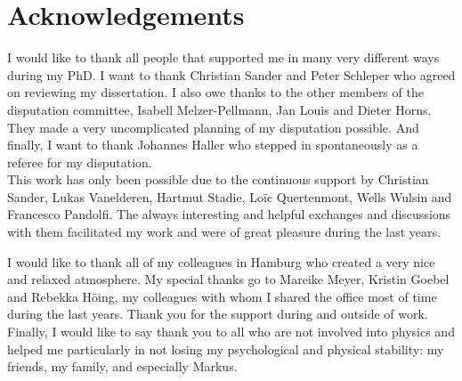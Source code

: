 \chapter*{Acknowledgements}
\vspace{1cm}

I would like to thank all people that supported me in many very different ways during my PhD.
I want to thank Christian Sander and Peter Schleper who agreed on reviewing my dissertation.
I also owe thanks to the other members of the disputation committee, Isabell Melzer-Pellmann, Jan Louis and Dieter Horns.
They made a very uncomplicated planning of my disputation possible.
And finally, I want to thank Johannes Haller who stepped in spontaneously as a referee for my disputation.\\

This work has only been possible due to the continuous support by Christian Sander, Lukas Vanelderen, Hartmut Stadie, Lo\"{i}c Quertenmont, Wells Wulsin and Francesco Pandolfi.
The always interesting and helpful exchanges and discussions with them facilitated my work and were of great pleasure during the last years.

I would like to thank all of my colleagues in Hamburg who created a very nice and relaxed atmosphere. 
My special thanks go to Mareike Meyer, Kristin Goebel and Rebekka H\"{o}ing, my colleagues with whom I shared the office most of time during the last years. 
Thank you for the support during and outside of work.\\

Finally, I would like to say thank you to all who are not involved into physics and helped me particularly in not losing my psychological and physical stability: my friends, my family, and especially Markus.
